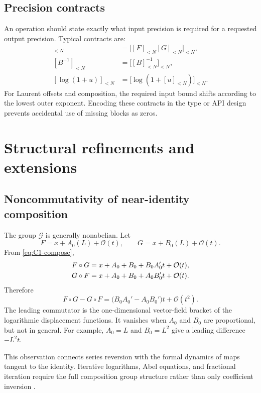 \documentclass[11pt]{article}
\theoremstyle{pltheorem}
\newcommand{\Gnear}{\mathcal G}
\newcommand{\bigO}{\mathcal O}
\newcommand{\compose}{\mathbin{\circ}}
\begin{document}
\subsection{Precision contracts}

An operation should state exactly what input precision is required for a requested output precision.  Typical contracts are:
\begin{align*}
 [FG]_{<N}&=\bigl[[F]_{<N}[G]_{<N}\bigr]_{<N},\\
 [B^{-1}]_{<N}&=\bigl[[B]_{<N}^{-1}\bigr]_{<N},\\
 [\log(1+u)]_{<N}&=\bigl[\log(1+[u]_{<N})\bigr]_{<N}.
\end{align*}
For Laurent offsets and composition, the required input bound shifts according to the lowest outer exponent.  Encoding these contracts in the type or API design prevents accidental use of missing blocks as zeros.

\section{Structural refinements and extensions}
\label{sec:extensions}

\subsection{Noncommutativity of near-identity composition}

The group \(\Gnear\) is generally nonabelian.  Let
\[
 F=x+A_0(L)+\bigO(t),
 \qquad
 G=x+B_0(L)+\bigO(t).
\]
From \cref{eq:C1-compose},
\begin{align}
 F\compose G
 &=x+A_0+B_0+B_0A_0't+\bigO(t),\notag\\
 G\compose F
 &=x+A_0+B_0+A_0B_0't+\bigO(t).
\end{align}
Therefore
\begin{equation}\label{eq:composition-commutator-leading}
 F\compose G-G\compose F
 =\bigl(B_0A_0'-A_0B_0'\bigr)t+\bigO(t^2).
\end{equation}
The leading commutator is the one-dimensional vector-field bracket of the logarithmic displacement functions.  It vanishes when \(A_0\) and \(B_0\) are proportional, but not in general.  For example, \(A_0=L\) and \(B_0=L^2\) give a leading difference \(-L^2t\).

This observation connects series reversion with the formal dynamics of maps tangent to the identity.  Iterative logarithms, Abel equations, and fractional iteration require the full composition group structure rather than only coefficient inversion \cite{edgar-fractional}.
\end{document}
